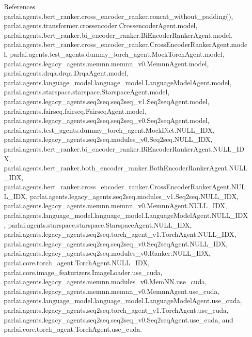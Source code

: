 References parlai.\+agents.\+bert\+\_\+ranker.\+cross\+\_\+encoder\+\_\+ranker.\+concat\+\_\+without\+\_\+padding(), parlai.\+agents.\+transformer.\+crossencoder.\+Crossencoder\+Agent.\+model, parlai.\+agents.\+bert\+\_\+ranker.\+bi\+\_\+encoder\+\_\+ranker.\+Bi\+Encoder\+Ranker\+Agent.\+model, parlai.\+agents.\+bert\+\_\+ranker.\+cross\+\_\+encoder\+\_\+ranker.\+Cross\+Encoder\+Ranker\+Agent.\+model, parlai.\+agents.\+test\+\_\+agents.\+dummy\+\_\+torch\+\_\+agent.\+Mock\+Torch\+Agent.\+model, parlai.\+agents.\+legacy\+\_\+agents.\+memnn.\+memnn\+\_\+v0.\+Memnn\+Agent.\+model, parlai.\+agents.\+drqa.\+drqa.\+Drqa\+Agent.\+model, parlai.\+agents.\+language\+\_\+model.\+language\+\_\+model.\+Language\+Model\+Agent.\+model, parlai.\+agents.\+starspace.\+starspace.\+Starspace\+Agent.\+model, parlai.\+agents.\+legacy\+\_\+agents.\+seq2seq.\+seq2seq\+\_\+v1.\+Seq2seq\+Agent.\+model, parlai.\+agents.\+fairseq.\+fairseq.\+Fairseq\+Agent.\+model, parlai.\+agents.\+legacy\+\_\+agents.\+seq2seq.\+seq2seq\+\_\+v0.\+Seq2seq\+Agent.\+model, parlai.\+agents.\+test\+\_\+agents.\+dummy\+\_\+torch\+\_\+agent.\+Mock\+Dict.\+N\+U\+L\+L\+\_\+\+I\+DX, parlai.\+agents.\+legacy\+\_\+agents.\+seq2seq.\+modules\+\_\+v0.\+Seq2seq.\+N\+U\+L\+L\+\_\+\+I\+DX, parlai.\+agents.\+bert\+\_\+ranker.\+bi\+\_\+encoder\+\_\+ranker.\+Bi\+Encoder\+Ranker\+Agent.\+N\+U\+L\+L\+\_\+\+I\+DX, parlai.\+agents.\+bert\+\_\+ranker.\+both\+\_\+encoder\+\_\+ranker.\+Both\+Encoder\+Ranker\+Agent.\+N\+U\+L\+L\+\_\+\+I\+DX, parlai.\+agents.\+bert\+\_\+ranker.\+cross\+\_\+encoder\+\_\+ranker.\+Cross\+Encoder\+Ranker\+Agent.\+N\+U\+L\+L\+\_\+\+I\+DX, parlai.\+agents.\+legacy\+\_\+agents.\+seq2seq.\+modules\+\_\+v1.\+Seq2seq.\+N\+U\+L\+L\+\_\+\+I\+DX, parlai.\+agents.\+legacy\+\_\+agents.\+memnn.\+memnn\+\_\+v0.\+Memnn\+Agent.\+N\+U\+L\+L\+\_\+\+I\+DX, parlai.\+agents.\+language\+\_\+model.\+language\+\_\+model.\+Language\+Model\+Agent.\+N\+U\+L\+L\+\_\+\+I\+DX, parlai.\+agents.\+starspace.\+starspace.\+Starspace\+Agent.\+N\+U\+L\+L\+\_\+\+I\+DX, parlai.\+agents.\+legacy\+\_\+agents.\+seq2seq.\+torch\+\_\+agent\+\_\+v1.\+Torch\+Agent.\+N\+U\+L\+L\+\_\+\+I\+DX, parlai.\+agents.\+legacy\+\_\+agents.\+seq2seq.\+seq2seq\+\_\+v0.\+Seq2seq\+Agent.\+N\+U\+L\+L\+\_\+\+I\+DX, parlai.\+agents.\+legacy\+\_\+agents.\+seq2seq.\+modules\+\_\+v0.\+Ranker.\+N\+U\+L\+L\+\_\+\+I\+DX, parlai.\+core.\+torch\+\_\+agent.\+Torch\+Agent.\+N\+U\+L\+L\+\_\+\+I\+DX, parlai.\+core.\+image\+\_\+featurizers.\+Image\+Loader.\+use\+\_\+cuda, parlai.\+agents.\+legacy\+\_\+agents.\+memnn.\+modules\+\_\+v0.\+Mem\+N\+N.\+use\+\_\+cuda, parlai.\+agents.\+legacy\+\_\+agents.\+memnn.\+memnn\+\_\+v0.\+Memnn\+Agent.\+use\+\_\+cuda, parlai.\+agents.\+language\+\_\+model.\+language\+\_\+model.\+Language\+Model\+Agent.\+use\+\_\+cuda, parlai.\+agents.\+legacy\+\_\+agents.\+seq2seq.\+torch\+\_\+agent\+\_\+v1.\+Torch\+Agent.\+use\+\_\+cuda, parlai.\+agents.\+legacy\+\_\+agents.\+seq2seq.\+seq2seq\+\_\+v0.\+Seq2seq\+Agent.\+use\+\_\+cuda, and parlai.\+core.\+torch\+\_\+agent.\+Torch\+Agent.\+use\+\_\+cuda.



